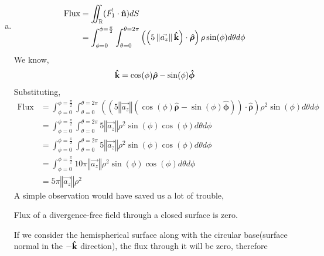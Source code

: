 \begin{problem}{}{}
    \begin{enumerate}[(a)]
        \item 
            \begin{align*}
                \text{Flux} &= \iint_{\mathbb{R}} (\vec{F_1}\cdot\boldsymbol{\hat{\textbf{n}}}) dS\\
                &=\int_{\phi=0}^{\phi=\frac{\pi}{2}}\int_{\theta = 0}^{\theta =2\pi} \left(\left(5\left\Vert\vec{a_z}\right\Vert\boldsymbol{\hat{\textbf{k}}}\right)\cdot{\boldsymbol{\hat{\rho}}}\right)\rho \sin(\phi)d\theta d\phi
            \end{align*}
            We know,
            \begin{align*}
                \boldsymbol{\hat{\textbf{k}}} = \cos(\phi)\boldsymbol{\hat{\rho}} - \sin(\phi)\boldsymbol{\hat{\phi}}
            \end{align*}
            Substituting, 
            \begin{align*}
                \text{Flux}&=\int_{\phi=0}^{\phi=\frac{\pi}{2}}\int_{\theta = 0}^{\theta =2\pi} \left(\left(5\left\Vert\vec{a_z}\right\Vert\left(\cos(\phi)\boldsymbol{\hat{\rho}} - \sin(\phi)\boldsymbol{\hat{\phi}}\right)\right)\cdot{\boldsymbol{\hat{\rho}}}\right)\rho^2 \sin(\phi)d\theta d\phi\\
                &=\int_{\phi=0}^{\phi=\frac{\pi}{2}}\int_{\theta = 0}^{\theta =2\pi} 5\left\Vert\vec{a_z}\right\Vert\rho^2 \sin(\phi)\cos \left(\phi \right)d\theta d\phi\\
                &=\int_{\phi=0}^{\phi=\frac{\pi}{2}}\int_{\theta = 0}^{\theta =2\pi} 5\left\Vert\vec{a_z}\right\Vert\rho^2 \sin(\phi)\cos \left(\phi \right)d\theta d\phi\\
                &=\int_{\phi=0}^{\phi=\frac{\pi}{2}} 10\pi\left\Vert\vec{a_z}\right\Vert\rho^2 \sin(\phi)\cos \left(\phi \right)d\theta d\phi\\
                &=5\pi\left\Vert\vec{a_z}\right\Vert\rho^2
            \end{align*}
            A simple observation would have saved us a lot of trouble,
                \begin{observation}
                    Flux of a divergence-free field through a closed surface is zero.
                \end{observation}
            If we consider the hemispherical surface along with the circular base(surface normal in the $-\boldsymbol{\hat{\textbf{k}}}$ direction), the flux through it will be zero, therefore
            \begin{align*}

\end{align*}
\end{enumerate}
\end{problem}
